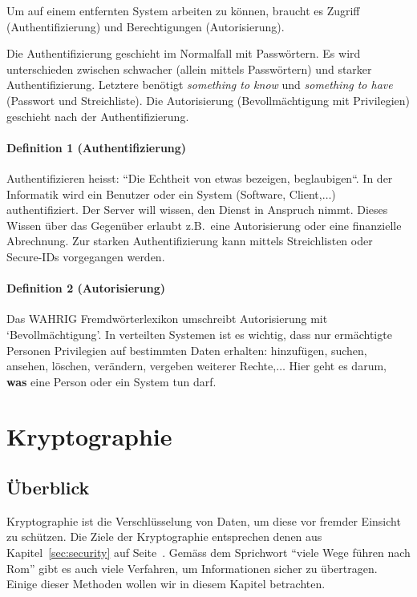 Um auf einem entfernten System arbeiten zu können, braucht es Zugriff
(Authentifizierung) und Berechtigungen (Autorisierung).

Die Authentifizierung geschieht im Normalfall mit Passwörtern. Es wird
unterschieden zwischen schwacher (allein mittels Passwörtern) und
starker Authentifizierung. Letztere benötigt \emph{something to know}
und \emph{something to have} (Passwort und Streichliste). Die Autorisierung
(Bevollmächtigung mit Privilegien) geschieht nach der Authentifizierung.

\paragraph*{Definition 1 (Authentifizierung)}
Authentifizieren heisst: ``Die Echtheit von etwas bezeigen, beglaubigen``\cite{wahrig}.
In der Informatik wird ein Benutzer oder ein System (Software, Client,$\ldots$)
authentifiziert. Der Server will wissen, den Dienst in Anspruch nimmt. Dieses
Wissen über das Gegenüber erlaubt z.B.~eine Autorisierung oder eine finanzielle
Abrechnung. Zur starken Authentifizierung kann mittels Streichlisten oder
Secure-IDs vorgegangen werden.

\paragraph*{Definition 2 (Autorisierung)}
Das WAHRIG Fremdwörterlexikon umschreibt Autorisierung mit `Bevollmächtigung'.
In verteilten Systemen ist es wichtig, dass nur ermächtigte Personen Privilegien
auf bestimmten Daten erhalten: hinzufügen, suchen, ansehen, löschen, verändern,
vergeben weiterer Rechte,$\ldots$
Hier geht es darum, \textbf{was} eine Person oder ein System tun darf.

\section{Kryptographie}

\subsection{Überblick}

Kryptographie ist die Verschlüsselung von Daten, um diese vor fremder Einsicht
zu schützen. Die Ziele der Kryptographie entsprechen denen aus
Kapitel~\ref{sec:security} auf Seite~\pageref{sec:security}.
Gemäss dem Sprichwort ``viele Wege führen nach Rom'' gibt es auch viele Verfahren,
um Informationen sicher zu übertragen. Einige dieser Methoden wollen wir in
diesem Kapitel betrachten.

